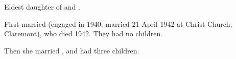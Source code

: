 
Eldest daughter of  and .\cite{MartinWalmondMarriage}

First married 
(engaged in 1940\cite{MartinWalmondEngagement}; married 21 April 1942 at Christ Church, Claremont\cite{MartinWalmondMarriage}),
who died 1942.
They had no children.

Then she married , and had three children.
